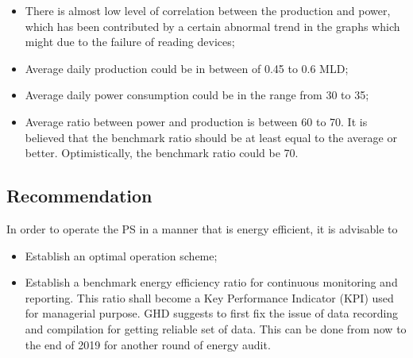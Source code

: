 \begin{itemize}
	\item There is almost low level of correlation between the production and power, which has been contributed by a certain abnormal trend in the graphs which might due to the failure of reading devices;
	
	\item Average daily production could be in between of 0.45 to 0.6 MLD;
	\item Average daily power consumption could be in the range from 30 to 35;
	\item Average ratio between power and production is between 60 to 70. It is believed that the benchmark ratio should be at least equal to the average or better. Optimistically, the benchmark ratio could be 70.
\end{itemize}

\subsection{Recommendation}
In order to operate the PS in a manner that is energy efficient, it is advisable to 

\begin{itemize}
\item Establish an optimal operation scheme;
\item Establish a benchmark energy efficiency ratio for continuous monitoring and reporting. This ratio shall become a Key Performance Indicator (KPI) used for managerial purpose. GHD suggests to first fix the issue of data recording and compilation for getting reliable set of data. This can be done from now to the end of 2019 for another round of energy audit.
\end{itemize}

